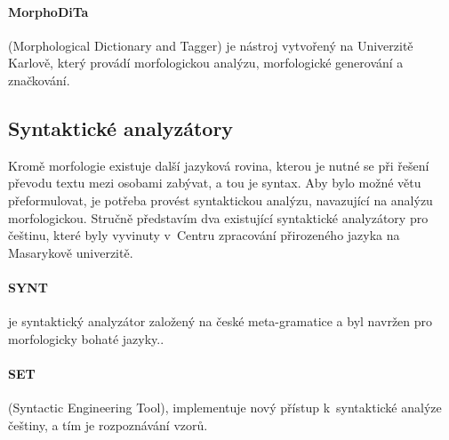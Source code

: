 \paragraph{MorphoDiTa} (Morphological Dictionary and Tagger) je nástroj vytvořený na Univerzitě Karlově, který provádí morfologickou analýzu, morfologické generování a značkování. \cite{strakova14}

\subsection{Syntaktické analyzátory}

Kromě morfologie existuje další jazyková rovina, kterou je nutné se při řešení převodu textu mezi osobami zabývat, a tou je syntax. Aby bylo možné větu přeformulovat, je potřeba provést syntaktickou analýzu, navazující na analýzu morfologickou. Stručně představím dva existující syntaktické analyzátory pro češtinu, které byly vyvinuty v~Centru zpracování přirozeného jazyka na Masarykově univerzitě.

\paragraph{SYNT} je syntaktický analyzátor založený na české meta-gramatice a byl navržen pro morfologicky bohaté jazyky..

\paragraph{SET} (Syntactic Engineering Tool), implementuje nový přístup k~syntaktické analýze češtiny, a tím je rozpoznávání vzorů. \cite{set}

